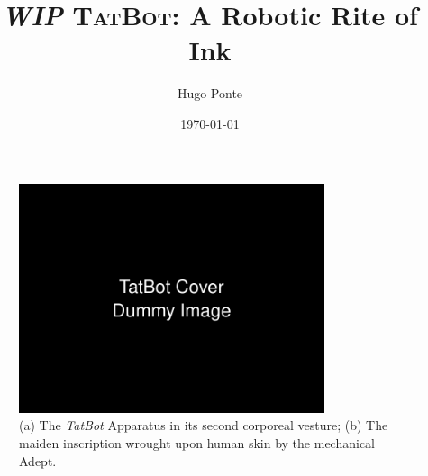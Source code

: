\documentclass[11pt]{article}
\title{\emph{WIP} \textsc{TatBot}: A Robotic Rite of Ink}
\author{Hugo Ponte}
\date{\today}
\begin{document}
\maketitle

\begin{figure}[h]
    \centering
    \includegraphics[width=0.8\textwidth]{figures/cover.png}
    \caption{(a) The \emph{TatBot} Apparatus in its second corporeal vesture; (b) The maiden inscription wrought upon human skin by the mechanical Adept.}
    \label{fig:cover}
\end{figure}
\end{document}
